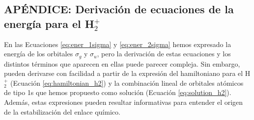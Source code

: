 \documentclass{tufte-handout}
\begin{document}
\subsection{APÉNDICE: Derivación de ecuaciones de la energía para el H$_2^+$}
En las Ecuaciones \ref{eq:ener_1sigma} y  \ref{eq:ener_2sigma} hemos expresado la energía de los orbitales $\sigma_g$ y $\sigma_u$, pero la derivación de estas ecuaciones y los distintos términos que aparecen en ellas puede parecer compleja.
Sin embargo, pueden derivarse con facilidad a partir de la expresión del hamiltoniano para el H$_2^+$ (Ecuación \ref{eq:hamiltonian_h2}) y la combinación lineal de orbitales atómicos de tipo 1s que hemos propuesto como solución (Ecuación \ref{eq:solution_h2}).
Además, estas expresiones pueden resultar informativas para entender el origen de la estabilización del enlace químico.
\end{document}
